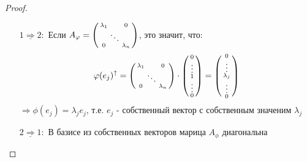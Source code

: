     \begin{proof} \tab
        \begin{itemize}
            \item[$\underline{1 \Rightarrow  2}:$] Если $A_\phi = \left(\begin{smallmatrix}
                \lambda_1 & \null & 0 \\
                \null & \ddots & \null \\
                0 & \null & \lambda_n
            \end{smallmatrix}\right)$, это значит, что: 
            $$\phi(e_j)^\uparrow = \left(\begin{smallmatrix}
                \lambda_1 & \null & 0 \\
                \null & \ddots & \null \\
                0 & \null & \lambda_n
            \end{smallmatrix}\right) \cdot \left(\begin{smallmatrix}
                0 \\
                \vdots \\
                1 \\
                \vdots \\
                0
            \end{smallmatrix}\right) = \left(\begin{smallmatrix}
                0 \\
                \vdots \\
                \lambda_j \\
                \vdots \\
                0
            \end{smallmatrix}\right)$$ $\Longrightarrow \phi(e_j) = \lambda_j e_j$, т.е. $e_j$ - собственный вектор с собственным значеним $\lambda_j$    

            \item[$\underline{2 \Rightarrow  1}:$] В базисе из собственных векторов марица $A_\phi$ диагональна
            

\end{itemize}
\end{proof}
